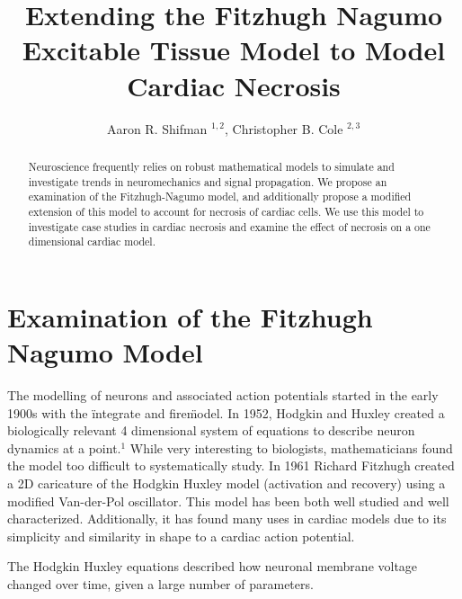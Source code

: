 \documentclass[11pt]{article}
\begin{document}
\title{Extending the Fitzhugh Nagumo Excitable Tissue Model to Model Cardiac Necrosis}
\author{Aaron R. Shifman $^{1,2}$, Christopher B. Cole $^{2,3}$}
\maketitle
\tableofcontents

\begin{abstract}

Neuroscience frequently relies on robust mathematical models to simulate and investigate trends in neuromechanics and signal propagation. We propose an examination of the Fitzhugh-Nagumo model, and additionally propose a modified extension of this model to account for necrosis of cardiac cells. We use this model to investigate case studies in cardiac necrosis and examine the effect of necrosis on a one dimensional cardiac model. 
\end{abstract}

\section{Examination of the Fitzhugh Nagumo Model}

The modelling of neurons and associated action potentials started in the early 1900s with the \"integrate and fire\" model. In 1952, Hodgkin and Huxley created a biologically relevant 4 dimensional system of equations to describe neuron dynamics at a point.$^1$ While very interesting to biologists, mathematicians found the model too difficult to systematically study. In 1961 Richard Fitzhugh created a 2D caricature of the Hodgkin Huxley model (activation and recovery) using a modified Van-der-Pol oscillator. This model has been both well studied and well characterized. Additionally, it has found many uses in cardiac models due to its simplicity and similarity in shape to a cardiac action potential. 

The Hodgkin Huxley equations described how neuronal membrane voltage changed over time, given a large number of parameters. 
\end{document}
